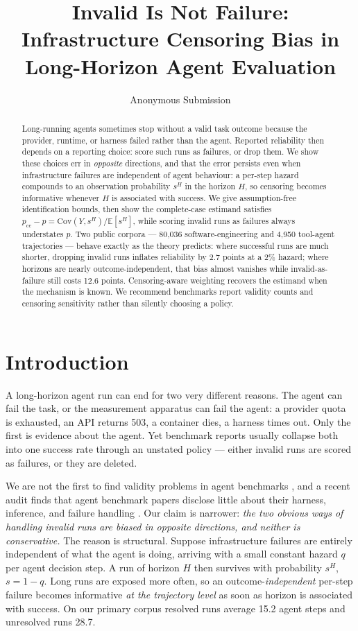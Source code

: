 \documentclass[letterpaper]{article}
\title{Invalid Is Not Failure:\\
Infrastructure Censoring Bias in Long-Horizon Agent Evaluation}
\author{Anonymous Submission}
\begin{document}
\maketitle

\begin{abstract}
Long-running agents sometimes stop without a valid task outcome because the
provider, runtime, or harness failed rather than the agent. Reported reliability
then depends on a reporting choice: score such runs as failures, or drop them.
We show these choices err in \emph{opposite} directions, and that the error
persists even when infrastructure failures are independent of agent behaviour: a
per-step hazard compounds to an observation probability $s^{H}$ in the horizon
$H$, so censoring becomes informative whenever $H$ is associated with success.
We give assumption-free identification bounds, then show the complete-case
estimand satisfies $p_{\mathrm{cc}}-p=\mathrm{Cov}(Y,s^{H})/\mathbb{E}[s^{H}]$,
while scoring invalid runs as failures always understates $p$. Two public
corpora --- 80{,}036 software-engineering and 4{,}950 tool-agent trajectories
--- behave exactly as the theory predicts: where successful runs are much
shorter, dropping invalid runs inflates reliability by 2.7 points at a 2\%
hazard; where horizons are nearly outcome-independent, that bias almost
vanishes while invalid-as-failure still costs 12.6 points. Censoring-aware
weighting recovers the estimand when the mechanism is known. We recommend
benchmarks report validity counts and censoring sensitivity rather than silently
choosing a policy.
\end{abstract}

\section{Introduction}

A long-horizon agent run can end for two very different reasons. The agent can
fail the task, or the measurement apparatus can fail the agent: a provider quota
is exhausted, an API returns 503, a container dies, a harness times out. Only
the first is evidence about the agent. Yet benchmark reports usually collapse
both into one success rate through an unstated policy --- either invalid runs
are scored as failures, or they are deleted.

We are not the first to find validity problems in agent benchmarks
\citep{kapoor2024agentsthatmatter,weidinger2025evalscience,zhu2026guardrails},
and a recent audit finds that agent benchmark papers disclose little about their
harness, inference, and failure handling \citep{moghadasi2026disclose}. Our
claim is narrower: \emph{the two obvious ways of handling invalid runs are
biased in opposite directions, and neither is conservative.} The reason is
structural. Suppose infrastructure failures are entirely independent of what the
agent is doing, arriving with a small constant hazard $q$ per agent decision
step. A run of horizon $H$ then survives with probability $s^{H}$, $s=1-q$.
Long runs are exposed more often, so an outcome-\emph{independent} per-step
failure becomes informative \emph{at the trajectory level} as soon as horizon is
associated with success. On our primary corpus resolved runs average 15.2 agent
steps and unresolved runs 28.7.
\end{document}
